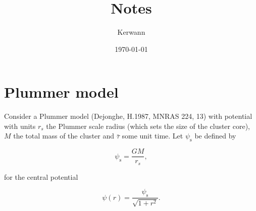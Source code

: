 \documentclass[11pt]{article}
\author{Kerwann}
\date{\today}
\title{Notes}
\newcommand{\rs}{\mathrm{s}}
\newcommand{\psis}{\psi_{\rs}}
\begin{document}
\maketitle

\section{Plummer model}
\label{sec:Plummer}

  Consider a Plummer model (Dejonghe, H.1987, MNRAS 224, 13) with potential
with units \(r_{s}\) the Plummer scale radius (which sets the size
of the cluster core), \(M\) the total mass of the cluster and \(\bar{\tau}\)
some unit time. Let $\psis$ be defined by

\begin{equation}
\psis = \frac{G M}{r_{s}} ,
\label{def_psi_s}
\end{equation}

for the central potential

\begin{equation}
\psi(r)=\frac{\psis}{\sqrt{1+r^{2}}} .
\label{def_potential}
\end{equation}
\end{document}
